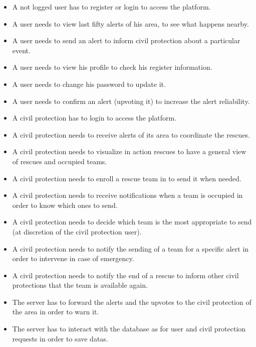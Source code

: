 \documentclass[a4paper,12pt]{report}
\begin{document}
\begin{itemize}
\item A not logged user has to register or login to access the platform.
\item A user needs to view last fifty alerts of his area, to see what happens nearby.
\item A user needs to send an alert to inform civil protection about a particular event.
\item A user needs to view his profile to check his register information.
\item A user needs to change his password to update it.
\item A user needs to confirm an alert (upvoting it) to increase the alert reliability.
\item A civil protection has to login to access the platform.
\item A civil protection needs to receive alerts of its area to coordinate the rescues.
\item A civil protection needs to visualize in action rescues to have a general view of rescues and occupied teams.
\item A civil protection needs to enroll a rescue team in to send it when needed.
\item A civil protection needs to receive notifications when a team is occupied in order to know which ones to send.
\item A civil protection needs to decide which team is the most appropriate to send (at discretion of the civil protection user).
\item A civil protection needs to notify the sending of a team for a specific alert in order to intervene in case of emergency.
\item A civil protection needs to notify the end of a rescue to inform other civil protections that the team is available again.
\item The server has to forward the alerts and the upvotes to the civil protection of the area in order to warn it.
\item The server has to interact with the database as for user and civil protection requests in order to save datas.
\end{itemize}
\end{document}
